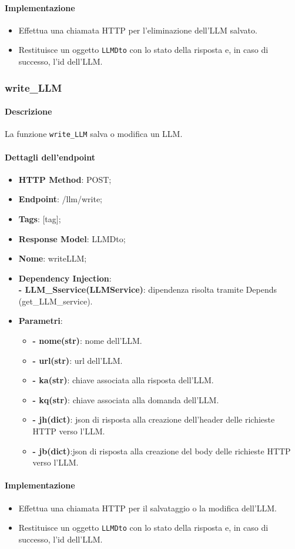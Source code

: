 \paragraph{Implementazione}
\begin{itemize}
    \item Effettua una chiamata HTTP per l'eliminazione dell'LLM salvato.
    \item Restituisce un oggetto \texttt{LLMDto} con lo stato della risposta e, in caso di successo, l'id dell'LLM.
\end{itemize}


\subsubsection{write\_LLM}
\label{sec:write_LLM}

\paragraph{Descrizione}
La funzione \texttt{write\_LLM} salva o modifica un LLM.

\paragraph{Dettagli dell'endpoint}
\begin{itemize}
    \item \textbf{HTTP Method}: POST;
    \item \textbf{Endpoint}: /llm/write;
    \item \textbf{Tags}: [tag];
    \item \textbf{Response Model}: LLMDto;
    \item \textbf{Nome}: writeLLM;
    \item \textbf{Dependency Injection}:\\ \textbf{- LLM\_Sservice(LLMService)}: dipendenza risolta tramite Depends (get\_LLM\_service).
    \item \textbf{Parametri}:
    \begin{itemize}
        \item \textbf{- nome(str)}: nome dell'LLM.
        \item \textbf{- url(str)}: url dell'LLM.
        \item \textbf{- ka(str)}: chiave associata alla risposta dell'LLM.
        \item \textbf{- kq(str)}: chiave associata alla domanda dell'LLM.
        \item \textbf{- jh(dict)}: json di risposta alla creazione dell'header delle richieste HTTP verso l'LLM.
        \item \textbf{- jb(dict)}:json di risposta alla creazione del body delle richieste HTTP verso l'LLM.
    \end{itemize}
\end{itemize}

\paragraph{Implementazione}
\begin{itemize}
    \item Effettua una chiamata HTTP per il salvataggio o la modifica dell'LLM.
    \item Restituisce un oggetto \texttt{LLMDto} con lo stato della risposta e, in caso di successo, l'id dell'LLM.
\end{itemize}